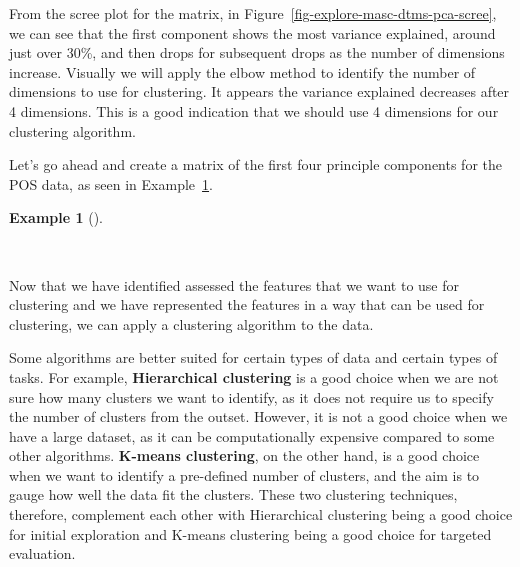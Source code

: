 \documentclass[
  letterpaper,
  krantz1]{latex/krantz-mod}
\newenvironment{Shaded}{\begin{snugshade}}{\end{snugshade}}
\newcommand{\CommentTok}[1]{\textcolor[rgb]{0.00,0.00,0.00}{\textit{#1}}}
\newcommand{\DecValTok}[1]{\textcolor[rgb]{0.00,0.00,0.00}{#1}}
\newcommand{\NormalTok}[1]{\textcolor[rgb]{0.00,0.00,0.00}{#1}}
\newcommand{\OtherTok}[1]{\textcolor[rgb]{0.00,0.00,0.00}{#1}}
\newcommand{\SpecialCharTok}[1]{\textcolor[rgb]{0.00,0.00,0.00}{#1}}
\theoremstyle{definition}
\newtheorem{example}{Example}[chapter]
\theoremstyle{definition}
\theoremstyle{remark}
\begin{document}
From the scree plot for the matrix, in
Figure~\ref{fig-explore-masc-dtms-pca-scree}, we can see that the first
component shows the most variance explained, around just over 30\%, and
then drops for subsequent drops as the number of dimensions increase.
Visually we will apply the elbow method to identify the number of
dimensions to use for clustering. It appears the variance explained
decreases after 4 dimensions. This is a good indication that we should
use 4 dimensions for our clustering algorithm.

Let's go ahead and create a matrix of the first four principle
components for the POS data, as seen in
Example~\ref{exm-explore-masc-pos-pca-pc}.

\begin{example}[]\protect\hypertarget{exm-explore-masc-pos-pca-pc}{}\label{exm-explore-masc-pos-pca-pc}

~

\begin{Shaded}
\end{Shaded}

\end{example}

Now that we have identified assessed the features that we want to use
for clustering and we have represented the features in a way that can be
used for clustering, we can apply a clustering algorithm to the data.

Some algorithms are better suited for certain types of data and certain
types of tasks. For example, \textbf{Hierarchical clustering} is a good
choice when we are not sure how many clusters we want to identify, as it
does not require us to specify the number of clusters from the outset.
However, it is not a good choice when we have a large dataset, as it can
be computationally expensive compared to some other algorithms.
\textbf{K-means clustering}, on the other hand, is a good choice when we
want to identify a pre-defined number of clusters, and the aim is to
gauge how well the data fit the clusters. These two clustering
techniques, therefore, complement each other with Hierarchical
clustering being a good choice for initial exploration and K-means
clustering being a good choice for targeted evaluation.
\end{document}
